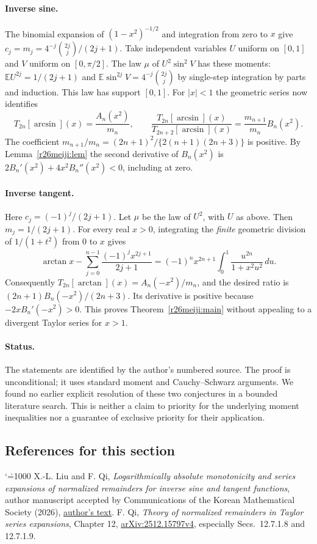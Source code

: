 \documentclass[11pt,a4paper]{article}
\makeatletter
\numberwithin{equation}{section}
\theoremstyle{definition}
\theoremstyle{remark}
\renewenvironment{thebibliography}[1]
 {\subsection*{References for this section}\small
  \list{\@biblabel{\@arabic\c@enumiv}}
       {\settowidth\labelwidth{\@biblabel{#1}}\leftmargin\labelwidth
        \advance\leftmargin\labelsep\@openbib@code
        \usecounter{enumiv}\let\p@enumiv\@empty
        \renewcommand\theenumiv{\@arabic\c@enumiv}}
  \sloppy\clubpenalty4000\widowpenalty4000\sfcode`\.=1000\relax}
 {\def\@noitemerr{\@latex@warning{Empty bibliography}}\endlist}
\makeatother
\begin{document}
\paragraph{Inverse sine.}
The binomial expansion of $(1-x^2)^{-1/2}$ and integration from
zero to $x$ give $c_j=m_j=4^{-j}\binom{2j}{j}/(2j+1)$.
Take independent variables $U$ uniform on $[0,1]$ and $V$ uniform on
$[0,\pi/2]$. The law $\mu$ of $U^2\sin^2 V$ has these moments:
$\mathbb E U^{2j}=1/(2j+1)$ and
$\mathbb E\sin^{2j}V=4^{-j}\binom{2j}{j}$ by single-step integration
by parts and induction. This law has support $[0,1]$.
For $|x|<1$ the geometric series now identifies
\[
 T_{2n}[\arcsin](x)=\frac{A_n(x^2)}{m_n},\qquad
 \frac{T_{2n}[\arcsin](x)}{T_{2n+2}[\arcsin](x)}
 =\frac{m_{n+1}}{m_n}B_n(x^2).
\]
The coefficient $m_{n+1}/m_n=(2n+1)^2/\{2(n+1)(2n+3)\}$ is positive.
By Lemma~\ref{r26meiji:lem} the second derivative of $B_n(x^2)$ is
$2B_n'(x^2)+4x^2B_n''(x^2)<0$, including at zero.

\paragraph{Inverse tangent.}
Here $c_j=(-1)^j/(2j+1)$. Let $\mu$ be the law of $U^2$, with $U$
as above. Then $m_j=1/(2j+1)$. For every real $x>0$,
integrating the \emph{finite} geometric division of $1/(1+t^2)$
from $0$ to $x$ gives
\[
 \arctan x-\sum_{j=0}^{n-1}\frac{(-1)^jx^{2j+1}}{2j+1}
 =(-1)^nx^{2n+1}\int_0^1\frac{u^{2n}}{1+x^2u^2}\,du .
\]
Consequently $T_{2n}[\arctan](x)=A_n(-x^2)/m_n$, and the desired
ratio is $(2n+1)B_n(-x^2)/(2n+3)$. Its derivative is positive because
$-2xB_n'(-x^2)>0$. This proves Theorem~\ref{r26meiji:main} without appealing
to a divergent Taylor series for $x>1$.

\paragraph{Status.}
The statements are identified by the author's numbered source.
The proof is unconditional; it uses standard moment and
Cauchy--Schwarz arguments. We found no earlier explicit resolution of
these two conjectures in a bounded literature search. This is neither
a claim to priority for the underlying moment inequalities nor a
guarantee of exclusive priority for their application.

\begin{thebibliography}{9}
 X.-L. Liu and F. Qi, \emph{Logarithmically absolute
monotonicity and series expansions of normalized remainders for
inverse sine and tangent functions}, author manuscript accepted by
Communications of the Korean Mathematical Society (2026),
\href{https://www.researchgate.net/publication/403516605}{author's text}.
 F. Qi, \emph{Theory of normalized remainders in Taylor
series expansions}, Chapter 12, \href{https://arxiv.org/html/2512.15797v4}{arXiv:2512.15797v4}, especially
Secs.~12.7.1.8 and 12.7.1.9.
\end{thebibliography}
\end{document}
